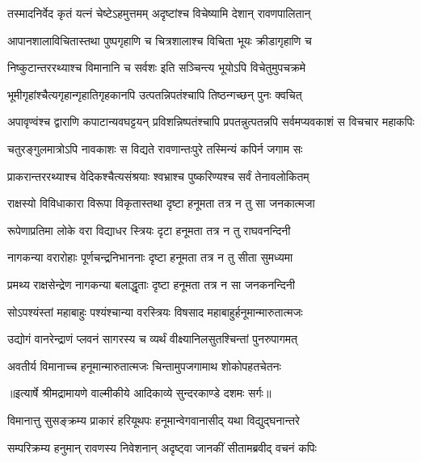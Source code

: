\twolineshloka
{तस्मादनिर्वेद कृतं यत्नं चेष्टेऽहमुत्तमम्}
{अदृष्टांश्च विचेष्यामि देशान् रावणपालितान्} %

\twolineshloka
{आपानशालाविचितास्तथा पुष्पगृहाणि च}
{चित्रशालाश्च विचिता भूयः क्रीडागृहाणि च} %

\twolineshloka
{निष्कुटान्तररथ्याश्च विमानानि च सर्वशः}
{इति सञ्चिन्त्य भूयोऽपि विचेतुमुपचक्रमे} %

\twolineshloka
{भूमीगृहांश्चैत्यगृहान्गृहातिगृहकानपि}
{उत्पतन्निपतंश्चापि तिष्ठन्गच्छन् पुनः क्वचित्} %

\threelineshloka
{अपावृण्वंश्च द्वाराणि कपाटान्यवघट्टयन्}
{प्रविशन्निष्पतंश्चापि प्रपतन्नुत्पतन्नपि}
{सर्वमप्यवकाशं स विचचार महाकपिः} %

\twolineshloka
{चतुरङ्गुलमात्रोऽपि नावकाशः स विद्यते}
{रावणान्तःपुरे तस्मिन्यं कपिर्न जगाम सः} %

\twolineshloka
{प्राकरान्तररथ्याश्च वेदिकश्चैत्यसंश्रयाः}
{श्वभ्राश्च पुष्करिण्यश्च सर्वं तेनावलोकितम्} %

\twolineshloka
{राक्षस्यो विविधाकारा विरूपा विकृतास्तथा}
{दृष्टा हनूमता तत्र न तु सा जनकात्मजा} %

\twolineshloka
{रूपेणाप्रतिमा लोके वरा विद्याधर स्त्रियः}
{दृटा हनूमता तत्र न तु राघवनन्दिनी} %

\twolineshloka
{नागकन्या वरारोहाः पूर्णचन्द्रनिभाननाः}
{दृष्टा हनूमता तत्र न तु सीता सुमध्यमा} %

\twolineshloka
{प्रमथ्य राक्षसेन्द्रेण नागकन्या बलाद्धृताः}
{दृष्टा हनूमता तत्र न सा जनकनन्दिनी} %

\twolineshloka
{सोऽपश्यंस्तां महाबाहुः पश्यंश्चान्या वरस्त्रियः}
{विषसाद महाबाहुर्हनूमान्मारुतात्मजः} %

\twolineshloka
{उद्योगं वानरेन्द्राणं प्लवनं सागरस्य च}
{व्यर्थं वीक्ष्यानिलसुतश्चिन्तां पुनरुपागमत्} %

\twolineshloka
{अवतीर्य विमानाच्च हनूमान्मारुतात्मजः}
{चिन्तामुपजगामाथ शोकोपहतचेतनः} %


{॥इत्यार्षे श्रीमद्रामायणे वाल्मीकीये आदिकाव्ये सुन्दरकाण्डे दशमः सर्गः॥}


\twolineshloka
{विमानात्तु सुसङ्क्रम्य प्राकारं हरियूथपः}
{हनूमान्वेगवानासीद् यथा विद्युद्घनान्तरे} %

\twolineshloka
{सम्परिक्रम्य हनुमान् रावणस्य निवेशनान्}
{अदृष्ट्वा जानकीं सीतामब्रवीद् वचनं कपिः} %

